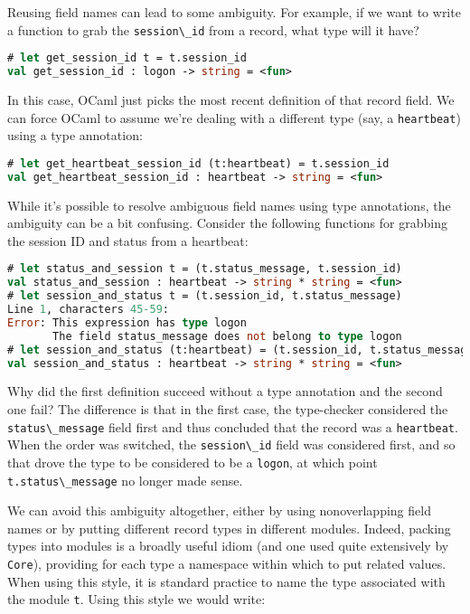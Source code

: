 Reusing field names can lead to some ambiguity. For example, if we want
to write a function to grab the \passthrough{\lstinline!session\_id!}
from a record, what type will it have?

\begin{lstlisting}[language=Caml]
# let get_session_id t = t.session_id
val get_session_id : logon -> string = <fun>
\end{lstlisting}

In this case, OCaml just picks the most recent definition of that record
field. We can force OCaml to assume we're dealing with a different type
(say, a \passthrough{\lstinline!heartbeat!}) using a type annotation:

\begin{lstlisting}[language=Caml]
# let get_heartbeat_session_id (t:heartbeat) = t.session_id
val get_heartbeat_session_id : heartbeat -> string = <fun>
\end{lstlisting}

While it's possible to resolve ambiguous field names using type
annotations, the ambiguity can be a bit confusing. Consider the
following functions for grabbing the session ID and status from a
heartbeat:

\begin{lstlisting}[language=Caml]
# let status_and_session t = (t.status_message, t.session_id)
val status_and_session : heartbeat -> string * string = <fun>
# let session_and_status t = (t.session_id, t.status_message)
Line 1, characters 45-59:
Error: This expression has type logon
       The field status_message does not belong to type logon
# let session_and_status (t:heartbeat) = (t.session_id, t.status_message)
val session_and_status : heartbeat -> string * string = <fun>
\end{lstlisting}

Why did the first definition succeed without a type annotation and the
second one fail? The difference is that in the first case, the
type-checker considered the \passthrough{\lstinline!status\_message!}
field first and thus concluded that the record was a
\passthrough{\lstinline!heartbeat!}. When the order was switched, the
\passthrough{\lstinline!session\_id!} field was considered first, and so
that drove the type to be considered to be a
\passthrough{\lstinline!logon!}, at which point
\passthrough{\lstinline!t.status\_message!} no longer made sense.

We can avoid this ambiguity altogether, either by using nonoverlapping
field names or by putting different record types in different modules.
Indeed, packing types into modules is a broadly useful idiom (and one
used quite extensively by \passthrough{\lstinline!Core!}), providing for
each type a namespace within which to put related values. When using
this style, it is standard practice to name the type associated with the
module \passthrough{\lstinline!t!}. Using this style we would write:

